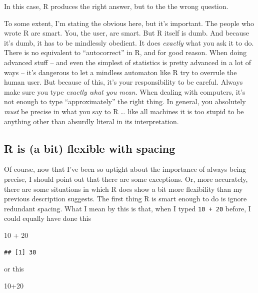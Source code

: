 \documentclass[
]{book}
\newenvironment{Shaded}{\begin{snugshade}}{\end{snugshade}}
\newcommand{\DecValTok}[1]{\textcolor[rgb]{0.00,0.00,0.81}{#1}}
\newcommand{\SpecialCharTok}[1]{\textcolor[rgb]{0.00,0.00,0.00}{#1}}
\begin{document}
In this case, R produces the right answer, but to the the wrong question.

To some extent, I'm stating the obvious here, but it's important. The people who wrote R are smart. You, the user, are smart. But R itself is dumb. And because it's dumb, it has to be mindlessly obedient. It does \emph{exactly} what you ask it to do. There is no equivalent to ``autocorrect'' in R, and for good reason. When doing advanced stuff -- and even the simplest of statistics is pretty advanced in a lot of ways -- it's dangerous to let a mindless automaton like R try to overrule the human user. But because of this, it's your responsibility to be careful. Always make sure you type \emph{exactly what you mean}. When dealing with computers, it's not enough to type ``approximately'' the right thing. In general, you absolutely \emph{must} be precise in what you say to R \ldots{} like all machines it is too stupid to be anything other than absurdly literal in its interpretation.

\hypertarget{r-is-a-bit-flexible-with-spacing}{%
\subsection{R is (a bit) flexible with spacing}\label{r-is-a-bit-flexible-with-spacing}}

Of course, now that I've been so uptight about the importance of always being precise, I should point out that there are some exceptions. Or, more accurately, there are some situations in which R does show a bit more flexibility than my previous description suggests. The first thing R is smart enough to do is ignore redundant spacing. What I mean by this is that, when I typed \texttt{10\ +\ 20} before, I could equally have done this

\begin{Shaded}
\begin{Highlighting}[]
\DecValTok{10}    \SpecialCharTok{+} \DecValTok{20}
\end{Highlighting}
\end{Shaded}

\begin{verbatim}
## [1] 30
\end{verbatim}

or this

\begin{Shaded}
\begin{Highlighting}[]
\DecValTok{10}\SpecialCharTok{+}\DecValTok{20}
\end{Highlighting}
\end{Shaded}
\end{document}
